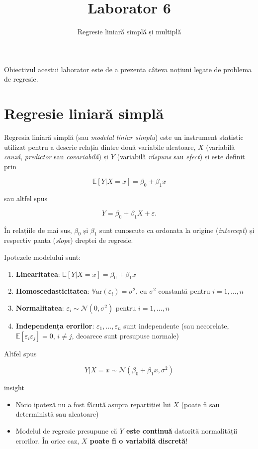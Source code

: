 \documentclass[]{article}
\title{Laborator 6}
\subtitle{Regresie liniară simplă și multiplă}
\author{}
\date{}
\providecommand{\tightlist}{%
  \setlength{\itemsep}{0pt}\setlength{\parskip}{0pt}}
\newenvironment{frshaded_insight*}{%
  \def\FrameCommand{\fboxrule=\FrameRule\fboxsep=\FrameSep \fcolorbox{framecolor_insight}{shadecolor_insight}}%
  \MakeFramed {\advance\hsize-\width \FrameRestore}}%
{\endMakeFramed}
\newenvironment{rmdblock_insight}[1]
  {\begin{frshaded_insight*}
  \begin{itemize}
  \renewcommand{\labelitemi}{
    \raisebox{-.7\height}[0pt][0pt]{
      {\setkeys{Gin}{width=2em,keepaspectratio}\texttt{[image: images/icons/\#1]}}
    }
  }
  \item
  }
  {
  \end{itemize}
  \end{frshaded_insight*}
  }
\newenvironment{rmdinsight}
  {\begin{rmdblock_insight}{insight}}
  {\end{rmdblock_insight}}
\begin{document}
\maketitle

\thispagestyle{fancy}

Obiectivul acestui laborator este de a prezenta câteva noțiuni legate de
problema de regresie.

\section{Regresie liniară simplă}\label{regresie-liniara-simpla}

Regresia liniară simplă (sau \emph{modelul liniar simplu}) este un
instrument statistic utilizat pentru a descrie relația dintre două
variabile aleatoare, \(X\) (variabilă \emph{cauză}, \emph{predictor} sau
\emph{covariabilă}) și \(Y\) (variabilă \emph{răspuns} sau \emph{efect})
și este definit prin

\[
\mathbb{E}[Y|X=x]=\beta_0+\beta_1x 
\]

sau altfel spus

\[
Y = \beta_0 + \beta_1 X + \varepsilon.
\]

În relațiile de mai sus, \(\beta_0\) și \(\beta_1\) sunt cunoscute ca
ordonata la origine (\emph{intercept}) și respectiv panta (\emph{slope})
dreptei de regresie.

Ipotezele modelului sunt:

\begin{enumerate}
\def\labelenumi{\roman{enumi}.}
\tightlist
\item
  \textbf{Linearitatea}: \(\mathbb{E}[Y|X=x]=\beta_0+\beta_1x\)
\item
  \textbf{Homoscedasticitatea}:
  \(\mathbb{V}\text{ar}(\varepsilon_i)=\sigma^2\), cu \(\sigma^2\)
  constantă pentru \(i=1,\ldots,n\)
\item
  \textbf{Normalitatea}: \(\varepsilon_i\sim\mathcal{N}(0,\sigma^2)\)
  pentru \(i=1,\ldots,n\)
\item
  \textbf{Independența erorilor}: \(\varepsilon_1,\ldots,\varepsilon_n\)
  sunt independente (sau necorelate,
  \(\mathbb{E}[\varepsilon_i\varepsilon_j]=0\), \(i\neq j\), deoarece
  sunt presupuse normale)
\end{enumerate}

Altfel spus

\[
Y|X=x\sim \mathcal{N}(\beta_0+\beta_1x,\sigma^2)
\]

\begin{rmdinsight}
\begin{itemize}
\item
  Nicio ipoteză nu a fost făcută asupra repartiției lui \(X\) (poate fi
  sau deterministă sau aleatoare)
\item
  Modelul de regresie presupune că \textbf{\(Y\) este continuă} datorită
  normalității erorilor. În orice caz, \textbf{\(X\) poate fi o
  variabilă discretă}!
\end{itemize}
\end{rmdinsight}
\end{document}
